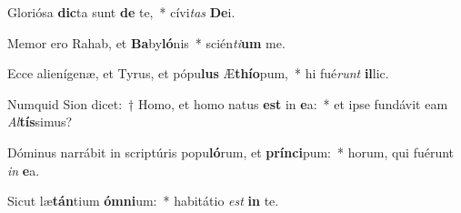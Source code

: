 \item Gloriósa \textbf{dic}ta sunt \textbf{de} te,~* cívi\textit{tas} \textbf{De}i.
\item Memor ero Rahab, et \textbf{Ba}by\textbf{ló}nis~* scién\textit{ti}\textbf{um} me.
\item Ecce alienígenæ, et Tyrus, et pópu\textbf{lus} Æ\textbf{thí}\textbf{o}pum,~* hi fué\textit{runt} \textbf{il}lic.
\item Numquid Sion dicet:~† Homo, et homo natus \textbf{est} in \textbf{e}a:~* et ipse fundávit eam \textit{Al}\textbf{tís}simus?
\item Dóminus narrábit in scriptúris popu\textbf{ló}rum, et \textbf{prín}\textbf{ci}pum:~* horum, qui fuérunt \textit{in} \textbf{e}a.
\item Sicut læ\textbf{tán}tium \textbf{óm}\textbf{ni}um:~* habitátio \textit{est} \textbf{in} te.
